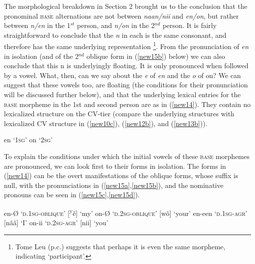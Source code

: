\documentclass[output=paper,colorlinks,citecolor=brown,
]{langscibook}
\begin{document}
The morphological breakdown in Section 2 brought us to the conclusion that the pronominal \textsc{base} alternations are not between \textit{naan/nii} and \textit{en/on}, but rather between \textit{n/en} in the 1$^{st}$ person, and \textit{n/on} in the 2$^{nd}$ person. It is fairly straightforward to conclude that the \textit{n} in each is the same consonant, and therefore has the same underlying representation \footnote{Tome Leu (p.c.) suggests that perhaps it is even the same morpheme, indicating ‘participant’.}.  From the pronunciation of \textit{en} in isolation (and of the 2$^{nd}$ oblique form in (\ref{new15b}) below) we can also conclude that this n is underlyingly floating. It is only pronounced when followed by a vowel. What, then, can we say about the \textit{e} of \textit{en} and the \textit{o} of on? We can suggest that these vowels too, are floating (the conditions for their pronunciation will be discussed further below), and that the underlying lexical entries for the \textsc{base} morpheme in the 1st and second person are as in (\ref{new14}). They contain no lexicalized structure on the CV-tier (compare the underlying structures with lexicalized CV structure in (\ref{new10c}), (\ref{new12b}), and (\ref{new13b})).

\begin{exe}
\ex \label{new14}
\begin{xlist}
\ex \label{new14a}
en	‘1\textsc{sg}’ 
\ex \label{new14b}
on	‘2\textsc{sg}’ 
\end{xlist}
\end{exe}

To explain the conditions under which the initial vowels of these \textsc{base} morphemes are pronounced, we can look first to their forms in isolation. The forms in (\ref{new14}) can be the overt manifestations of the oblique forms, whose suffix is null, with the pronunciations in (\ref{new15a},\ref{new15b}), and the nominative pronouns can be seen in (\ref{new15c},\ref{new15d}).

\begin{exe}
\ex \label{new15}
\begin{xlist}
\ex \label{new15a}
en-Ø 	\hspace{1cm}	‘\textsc{d}.1\textsc{sg-oblique}’	 \hspace{1.15cm}    	[\textsuperscript{y}ẽ]  \hspace{1cm}   	‘my’ 
\ex \label{new15b}
on-Ø 	\hspace{1cm}	‘\textsc{d}.2\textsc{sg-oblique}’	 \hspace{1cm}    	[wõ]   \hspace{0.95cm}    	‘your’ 
\ex \label{new15c}
en-een 	\hspace{0.7cm}    ‘\textsc{d}.1\textsc{sg-agr}’   \hspace{1.75cm} 		[nãã] \hspace{0.9cm}      	‘I’ 
\ex \label{new15d}
on-ii 	\hspace{1cm}	‘\textsc{d}.2\textsc{sg-agr}’      \hspace{1.75cm}    		[nii]   \hspace{1cm}     	‘you’ 
\end{xlist}
\end{exe}
\end{document}

